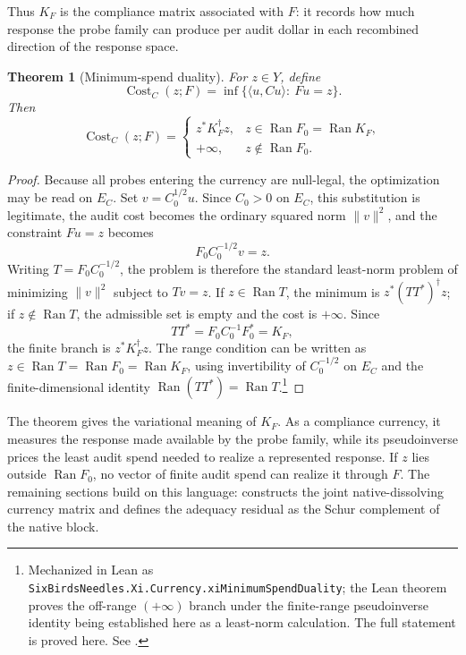\documentclass[11pt]{article}
\DeclareMathOperator{\Cost}{Cost}
\DeclareMathOperator{\Ran}{Ran}
\newtheorem{theorem}{Theorem}[section]
\theoremstyle{definition}
\begin{document}
Thus \(K_F\) is the compliance matrix associated with \(F\): it records how much
response the probe family can produce per audit dollar in each recombined
direction of the response space.

\begin{theorem}[Minimum-spend duality]\label{thm:xi:minimum-spend-duality}
For \(z\in Y\), define
\[
  \Cost_C(z;F)
  =
  \inf\bigl\{\langle u,Cu\rangle:\ Fu=z\bigr\}.
\]
Then
\[
  \Cost_C(z;F)
  =
  \begin{cases}
    z^*K_F^\dagger z,
      & z\in \Ran F_0=\Ran K_F,\\
    +\infty,
      & z\notin \Ran F_0.
  \end{cases}
\]
\end{theorem}

\begin{proof}
Because all probes entering the currency are null-legal, the optimization may
be read on \(E_C\).  Set \(v=C_0^{1/2}u\).  Since \(C_0>0\) on \(E_C\), this
substitution is legitimate, the audit cost becomes the ordinary squared norm
\(\|v\|^2\), and the constraint \(Fu=z\) becomes
\[
  F_0C_0^{-1/2}v=z.
\]
Writing \(T=F_0C_0^{-1/2}\), the problem is therefore the standard
least-norm problem of minimizing \(\|v\|^2\) subject to \(Tv=z\).  If
\(z\in\Ran T\), the minimum is \(z^*(TT^*)^\dagger z\); if
\(z\notin\Ran T\), the admissible set is empty and the cost is \(+\infty\).
Since
\[
  TT^*=F_0C_0^{-1}F_0^*=K_F,
\]
the finite branch is \(z^*K_F^\dagger z\).  The range condition can be written
as \(z\in\Ran T=\Ran F_0=\Ran K_F\), using invertibility of \(C_0^{-1/2}\) on
\(E_C\) and the finite-dimensional identity \(\Ran(TT^*)=\Ran T\).\footnote{Mechanized in Lean as \texttt{SixBirdsNeedles.Xi.Currency.xiMinimumSpendDuality}; the Lean theorem proves the off-range \((+\infty)\) branch under the finite-range pseudoinverse identity being established here as a least-norm calculation.  The full statement is proved here.  See .}
\end{proof}

The theorem gives the variational meaning of \(K_F\).  As a compliance currency,
it measures the response made available by the probe family, while its
pseudoinverse prices the least audit spend needed to realize a represented
response.  If \(z\) lies outside \(\Ran F_0\), no vector of finite audit spend
can realize it through \(F\).  The remaining sections build on this language:
 constructs the joint native-dissolving currency
matrix and defines the adequacy residual as the Schur complement of the native
block.
\end{document}

